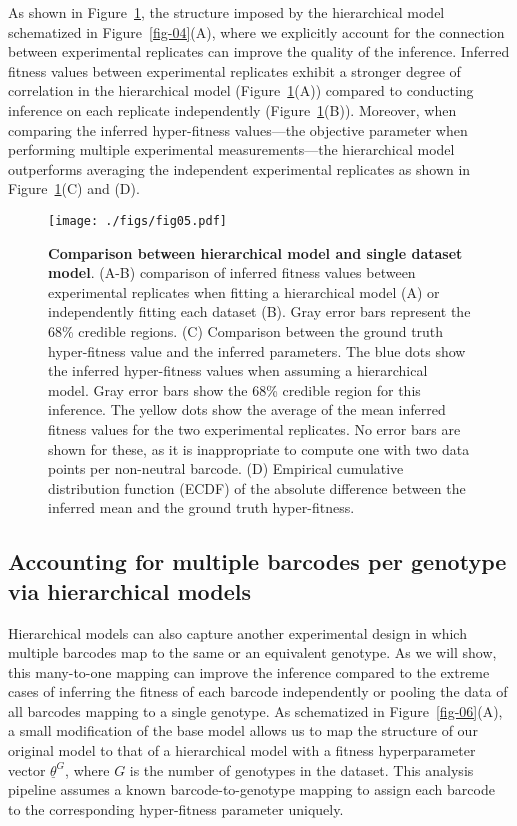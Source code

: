 \documentclass[
]{scrartcl}
\begin{document}
\begin{refsegment}
\begin{figure}
\end{figure}

As shown in Figure~\ref{fig-05}, the structure imposed by the
hierarchical model schematized in Figure~\ref{fig-04}(A), where we
explicitly account for the connection between experimental replicates
can improve the quality of the inference. Inferred fitness values
between experimental replicates exhibit a stronger degree of correlation
in the hierarchical model (Figure~\ref{fig-05}(A)) compared to
conducting inference on each replicate independently
(Figure~\ref{fig-05}(B)). Moreover, when comparing the inferred
hyper-fitness values---the objective parameter when performing multiple
experimental measurements---the hierarchical model outperforms averaging
the independent experimental replicates as shown in
Figure~\ref{fig-05}(C) and (D).

\begin{figure}

{\centering \texttt{[image: ./figs/fig05.pdf]}

}

\caption{\label{fig-05}\textbf{Comparison between hierarchical model and
single dataset model}. (A-B) comparison of inferred fitness values
between experimental replicates when fitting a hierarchical model (A) or
independently fitting each dataset (B). Gray error bars represent the
68\% credible regions. (C) Comparison between the ground truth
hyper-fitness value and the inferred parameters. The blue dots show the
inferred hyper-fitness values when assuming a hierarchical model. Gray
error bars show the 68\% credible region for this inference. The yellow
dots show the average of the mean inferred fitness values for the two
experimental replicates. No error bars are shown for these, as it is
inappropriate to compute one with two data points per non-neutral
barcode. (D) Empirical cumulative distribution function (ECDF) of the
absolute difference between the inferred mean and the ground truth
hyper-fitness.}

\end{figure}

\hypertarget{sec-genotypes}{%
\subsection{Accounting for multiple barcodes per genotype via
hierarchical models}\label{sec-genotypes}}

Hierarchical models can also capture another experimental design in
which multiple barcodes map to the same or an equivalent genotype. As we
will show, this many-to-one mapping can improve the inference compared
to the extreme cases of inferring the fitness of each barcode
independently or pooling the data of all barcodes mapping to a single
genotype. As schematized in Figure~\ref{fig-06}(A), a small modification
of the base model allows us to map the structure of our original model
to that of a hierarchical model with a fitness hyperparameter vector
\(\underline{\theta}^G\), where \(G\) is the number of genotypes in the
dataset. This analysis pipeline assumes a known barcode-to-genotype
mapping to assign each barcode to the corresponding hyper-fitness
parameter uniquely.


\end{refsegment}
\end{document}
